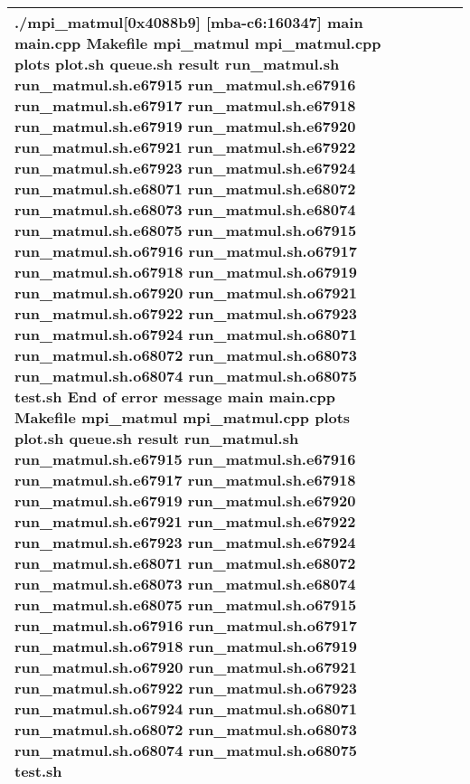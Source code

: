 \documentclass{article}
\begin{document}
\begin{tabular} { | l | l | l | l | l | l | }
./mpi_matmul[0x4088b9] [mba-c6:160347] main main.cpp Makefile mpi_matmul mpi_matmul.cpp plots plot.sh queue.sh result run_matmul.sh run_matmul.sh.e67915 run_matmul.sh.e67916 run_matmul.sh.e67917 run_matmul.sh.e67918 run_matmul.sh.e67919 run_matmul.sh.e67920 run_matmul.sh.e67921 run_matmul.sh.e67922 run_matmul.sh.e67923 run_matmul.sh.e67924 run_matmul.sh.e68071 run_matmul.sh.e68072 run_matmul.sh.e68073 run_matmul.sh.e68074 run_matmul.sh.e68075 run_matmul.sh.o67915 run_matmul.sh.o67916 run_matmul.sh.o67917 run_matmul.sh.o67918 run_matmul.sh.o67919 run_matmul.sh.o67920 run_matmul.sh.o67921 run_matmul.sh.o67922 run_matmul.sh.o67923 run_matmul.sh.o67924 run_matmul.sh.o68071 run_matmul.sh.o68072 run_matmul.sh.o68073 run_matmul.sh.o68074 run_matmul.sh.o68075 test.sh End of error message main main.cpp Makefile mpi_matmul mpi_matmul.cpp plots plot.sh queue.sh result run_matmul.sh run_matmul.sh.e67915 run_matmul.sh.e67916 run_matmul.sh.e67917 run_matmul.sh.e67918 run_matmul.sh.e67919 run_matmul.sh.e67920 run_matmul.sh.e67921 run_matmul.sh.e67922 run_matmul.sh.e67923 run_matmul.sh.e67924 run_matmul.sh.e68071 run_matmul.sh.e68072 run_matmul.sh.e68073 run_matmul.sh.e68074 run_matmul.sh.e68075 run_matmul.sh.o67915 run_matmul.sh.o67916 run_matmul.sh.o67917 run_matmul.sh.o67918 run_matmul.sh.o67919 run_matmul.sh.o67920 run_matmul.sh.o67921 run_matmul.sh.o67922 run_matmul.sh.o67923 run_matmul.sh.o67924 run_matmul.sh.o68071 run_matmul.sh.o68072 run_matmul.sh.o68073 run_matmul.sh.o68074 run_matmul.sh.o68075 test.sh \\ \hline
\hline
\end{tabular}
\end{document}
